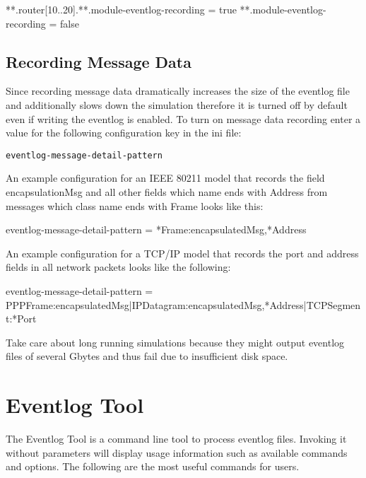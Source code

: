 \begin{inifile}
**.router[10..20].**.module-eventlog-recording = true
**.module-eventlog-recording = false
\end{inifile}

\subsection{Recording Message Data}

Since recording message data dramatically increases the size of the eventlog file and
additionally slows down the simulation therefore it is turned off by default even if
writing the eventlog is enabled. To turn on message data recording enter a value for the
following configuration key in the ini file:

\begin{verbatim}
eventlog-message-detail-pattern
\end{verbatim}

An example configuration for an IEEE 80211 model that records the field encapsulationMsg
and all other fields which name ends with Address from messages which class name ends with
Frame looks like this:

\begin{inifile}
eventlog-message-detail-pattern = *Frame:encapsulatedMsg,*Address
\end{inifile}

An example configuration for a TCP/IP model that records the port and address fields in
all network packets looks like the following:

\begin{inifile}
eventlog-message-detail-pattern =
 PPPFrame:encapsulatedMsg|IPDatagram:encapsulatedMsg,*Address|TCPSegment:*Port
\end{inifile}

\begin{note}
    Take care about long running simulations because they might output eventlog
    files of several Gbytes and thus fail due to insufficient disk space.
\end{note}


\section{Eventlog Tool}

The Eventlog Tool is a command line tool to process eventlog files. Invoking it without
parameters will display usage information such as available commands and options. The
following are the most useful commands for users.


